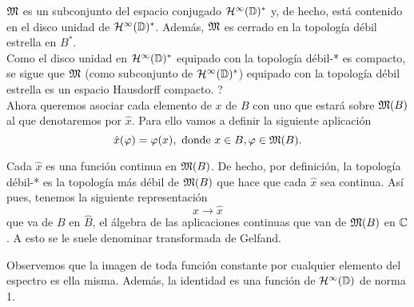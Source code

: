 $\mathfrak{M}$ es un subconjunto del espacio conjugado $\mathcal{H}^{\infty}(\mathbb{D})^*$ y, de hecho, está contenido en el disco unidad de $\mathcal{H}^{\infty}(\mathbb{D})^*$. Además, $\mathfrak{M}$ es cerrado en la topología débil estrella en $B^*$. \\

Como el disco unidad en $\mathcal{H}^{\infty}(\mathbb{D})^*$ equipado con la topología débil-* es compacto, se sigue que $\mathfrak{M}$ (como subconjunto de $\mathcal{H}^{\infty}(\mathbb{D})^*$) equipado con la topología débil estrella es un espacio Hausdorff compacto. ? \\

Ahora queremos asociar cada elemento de $x$ de $B$ con uno que estará sobre $\mathfrak{M}(B)$ al que denotaremos por $\hat x$. Para ello vamos a definir la siguiente aplicación
\begin{equation*}
    \hat x (\varphi) = \varphi (x), \text{ donde } x \in B, \varphi \in \mathfrak{M} (B).
\end{equation*}

Cada $\hat x$ es una función continua en $\mathfrak{M} (B)$. De hecho, por definición, la topología débil-* es la topología más débil de $\mathfrak{M} (B)$ que hace que cada $\hat x$ sea continua. Así pues, tenemos la siguiente representación
\begin{equation*}
    x \rightarrow \hat x
\end{equation*}
que va de $B$ en $\hat B$, el álgebra de las aplicaciones continuas que van de $\mathfrak{M}(B)$ en $\mathbb{C}$. A esto se le suele denominar transformada de Gelfand.




\bigskip

Observemos que la imagen de toda función constante por cualquier elemento del espectro es ella misma. Además, la identidad es una función de $\mathcal{H}^{\infty}(\mathbb{D})$ de norma 1. \\


\begin{comment}
Sabemos que existe una correspondencia uno a uno entre los homomorfismos $\phi$ de $\bholomorphic{\disk}$ en el álgebra de los números complejos y los ideales maximales $M$ en el álgebra $\bholomorphic{\disk}$. Esta correspondencia está definida por $M = \ker (\phi)$. Cada ideal maximal $M$ es cerrado, así que cada homomorfismo $\phi$ es continuo:
\begin{equation*}
    \abs{\phi (x)} \leq \norm{x}.
\end{equation*}
\end{comment}


